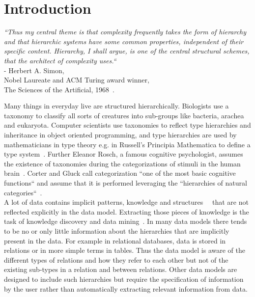 \chapter{Introduction}
\begin{center}
    \textit{``Thus my central theme is that complexity frequently takes the form of hierarchy and that hierarchic systems have some common properties, independent of their specific content. Hierarchy, I shall argue, is one of the central structural schemes, that the architect of complexity uses.``} \\
    \vspace{0.3cm}
    - Herbert A. Simon, \\
    Nobel Laureate and ACM Turing award winner, \\
    The Sciences of the Artificial, 1968~\cite{simon2019sciences}. \\
\end{center}{}
\vspace{1cm}
Many things in everyday live are structured hierarchically. Biologists use a taxonomy to classify all sorts of creatures into sub-groups like bacteria, arachea and eukaryota. Computer scientists use taxonomies to reflect type hierarchies and inheritance in object oriented programming, and type hierarchies are used by mathematicians in type theory e.g. in Russell's Principia Mathematica to define a type system~\cite{whitehead1912principia, TUPPER2011369}. Further Eleanor Rosch, a famous cognitive psychologist, assumes the existence of taxonomies during the categorizations of stimuli in the human brain~\cite{Rosch1976BasicOI}. Corter and Gluck call categorization ``one of the most basic cognitive functions`` and assume that it is performed leveraging the ``hierarchies of natural categories``~\cite{corter1992explaining}.\\

\noindent A lot of data contains implicit patterns, knowledge and structures~\cite{mitchell2006discipline}~\cite{carlsson2009topology} that are not reflected explicitly in the data model. Extracting those pieces of knowledge is the task of knowledge discovery and data mining~\cite{SIGKDD-2019-12-11}. In many data models there tends to be no or only little information about the hierarchies that are implicitly present in the data. For example in relational databases, data is stored in relations or in more simple terms in tables. Thus the data model is aware of the different types of relations and how they refer to each other but not of the existing sub-types in a relation and between relations. Other data models are designed to include such hierarchies but require the specification of information by the user rather than automatically extracting relevant information from data. \\


